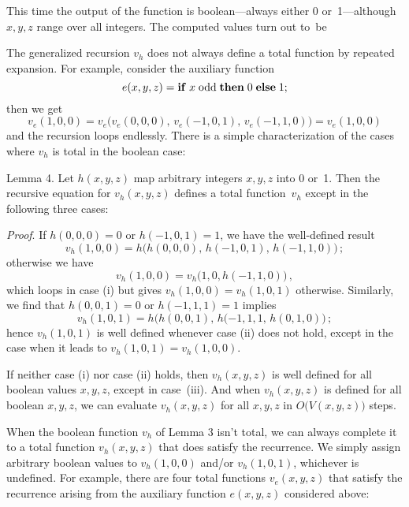 \documentclass{article}
\begin{document}
\smallskip\noindent
This time the output of the function is boolean---always either 0
or~1---although $x,y,z$ range over all integers. The computed values turn
out to~be

\smallskip
{}

\smallskip
The generalized recursion $v_h$ does not always define a total
function by repeated expansion.
For example, consider the auxiliary function
$$e(x,y,z)={\bf if}\; x\;{\rm odd}\;{\bf then}\;0\;{\bf else}\;1;$$
then we get
$$v_e(1,0,0)=v_e\bigl(v_e(0,0,0),\,v_e(-1,0,1),\,v_e(-1,1,0)\bigr)
=v_e(1,0,0)$$
and the recursion loops endlessly. There is a simple characterization
of the cases where $v_h$ is total in the boolean case:

\proclaim Lemma 4. Let $h(x,y,z)$ map arbitrary integers $x,y,z$
into 0 or~1. Then the recursive equation for $v_h(x,y,z)$ defines
a total function~$v_h$ except in the following three cases:


\bigskip\noindent
{\it Proof}.\enspace
If $h(0,0,0)=0$ or $h(-1,0,1)=1$, we have the well-defined result
$$v_h(1,0,0)=h\bigl(h(0,0,0),\,h(-1,0,1),\,h(-1,1,0)\bigr)\,;$$
otherwise we have
$$v_h(1,0,0)=v_h\bigl(1,0,h(-1,1,0)\bigr)\,,$$
which loops in case (i) but gives $v_h(1,0,0)=v_h(1,0,1)$ otherwise.
Similarly, we find that $h(0,0,1)=0$ or $h(-1,1,1)=1$ implies
$$v_h(1,0,1)=h\bigl(h(0,0,1),\,h(-1,1,1,\,h(0,1,0)\bigr)\,;$$
hence $v_h(1,0,1)$ is well defined whenever case (ii) does not hold,
except in the case when it leads to $v_h(1,0,1)=v_h(1,0,0)$.

If neither case (i) nor case (ii) holds, then $v_h(x,y,z)$ is well
defined for all boolean values $x,y,z$, except in case~(iii).
And when $v_h(x,y,z)$ is defined for all boolean $x,y,z$, we can
evaluate $v_h(x,y,z)$ for all $x,y,z$ in $O\bigl(V(x,y,z)\bigr)$
steps.\quad\pfbox

\smallskip
When the boolean function $v_h$ of Lemma 3 isn't total, we can always
complete it to a total function $v_h(x,y,z)$ that does satisfy
the recurrence. We simply assign arbitrary boolean values to
$v_h(1,0,0)$ and/or $v_h(1,0,1)$, whichever is undefined. For example,
there are four total functions $v_e(x,y,z)$ that satisfy the
recurrence
 arising from the auxiliary function $e(x,y,z)$ considered above:
\end{document}
